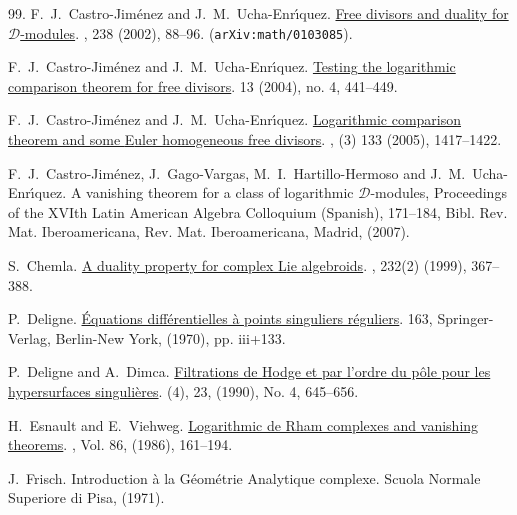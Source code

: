\documentclass[12pt]{article}
\newcommand{\DD}{\mathcal{D}}
\begin{document}
\begin{thebibliography}{99.}
F.~J.~Castro-Jim{\'e}nez and J.~M.~Ucha-Enr{\'\i}quez.
\newblock \href{https://www.mathnet.ru/eng/tm/v238/p97}{Free divisors and duality for {$\DD$}-modules}.
, 238 (2002), 88--96.
\newblock ({\tt arXiv:math/0103085}).

 F.~J.~Castro-Jim{\'e}nez and J.~M.~Ucha-Enr{\'\i}quez.
\newblock \href{http://projecteuclid.org/euclid.em/1109106436}{Testing the logarithmic comparison theorem for free divisors}.
 13 (2004), no. 4, 441--449.

{F.~J.~Castro-Jim\'{e}nez and J.~M.~Ucha-Enr\'{\i}quez.}
\newblock \href{https://doi.org/10.1090/S0002-9939-04-07678-6}{Logarithmic comparison theorem and some {E}uler homogeneous free divisors}.
, (3) {133} {(2005)}, {1417--1422}.

 F.~J.~Castro-Jim\'enez, J.~Gago-Vargas, M.~I.~Hartillo-Hermoso and J.~M.~Ucha-Enr{\'\i}quez.
\newblock A vanishing theorem for a class of logarithmic $\mathcal D$-modules,
\newblock Proceedings of the XVIth Latin American Algebra Colloquium (Spanish), 171--184, Bibl. Rev. Mat. Iberoamericana, Rev. Mat. Iberoamericana, Madrid, (2007).

S.~Chemla.
\newblock \href{https://doi.org/10.1007/s002090050520}{A duality property for complex {L}ie algebroids}.
, 232(2) (1999), 367--388.

 P.~Deligne.
\newblock \href{https://doi.org/10.1007/BFb0061194}{\'{E}quations diff\'{e}rentielles \`a points singuliers r\'{e}guliers}.
 163, {Springer-Verlag, Berlin-New York}, {(1970)}, pp. {iii+133}.

 P.~Deligne and A.~Dimca.
\newblock \href{http://www.numdam.org/item?id=ASENS_1990_4_23_4_645_0}{Filtrations de {H}odge et par l'ordre du p\^{o}le pour les hypersurfaces singuli\`eres}.
 (4), 23, (1990), No. 4, 645--656.

 H.~Esnault and E.~Viehweg.
\newblock \href{https://doi.org/10.1007/BF01391499}{Logarithmic de Rham complexes and vanishing theorems}.
, Vol. 86, (1986), 161--194.

 J.~Frisch.
\newblock Introduction \`a la G\'eom\'etrie Analytique complexe.
\newblock Scuola Normale Superiore di Pisa, (1971).


\end{thebibliography}
\end{document}
